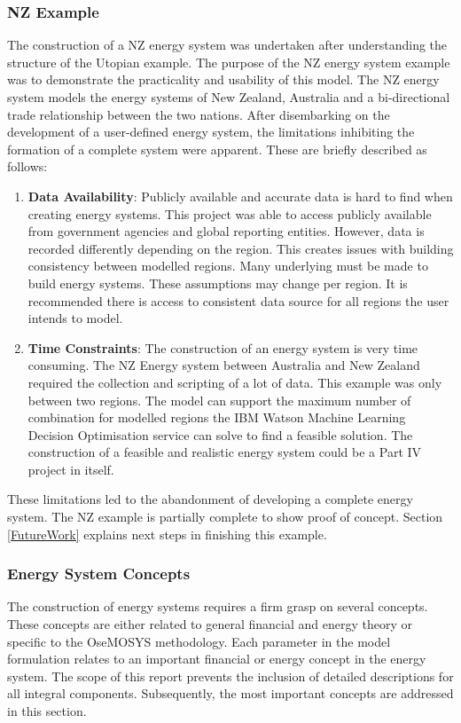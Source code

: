 \documentclass[12pt]{article}
\begin{document}
\subsubsection{NZ Example} \label{NZES}
The construction of a NZ energy system was undertaken after understanding the structure of the Utopian example.
The purpose of the NZ energy system example was to demonstrate the practicality and usability of this model.
The NZ energy system models the energy systems of New Zealand, Australia and a bi-directional trade relationship between the two nations.
After disembarking on the development of a user-defined energy system, the limitations inhibiting the formation of a complete system were apparent.
These are briefly described as follows:
\begin{enumerate}
	\item \textbf{Data Availability}: Publicly available and accurate data is hard to find when creating energy systems.
	This project was able to access publicly available from government agencies and global reporting entities.
	However, data is recorded differently depending on the region.
	This creates issues with building consistency between modelled regions.
	Many underlying must be made to build energy systems.
	These assumptions may change per region.
	It is recommended there is access to consistent data source for all regions the user intends to model.

	\item \textbf{Time Constraints}: The construction of an energy system is very time consuming.
	The NZ Energy system between Australia and New Zealand required the collection and scripting of a lot of data.
	This example was only between two regions.
	The model can support the maximum number of combination for modelled regions the IBM Watson Machine Learning Decision Optimisation service can solve to find a feasible solution.
	The construction of a feasible and realistic energy system could be a Part IV project in itself.
\end{enumerate}
These limitations led to the abandonment of developing a complete energy system.
The NZ example is partially complete to show proof of concept.
Section \ref{FutureWork} explains next steps in finishing this example.

\subsubsection{Energy System Concepts}
The construction of energy systems requires a firm grasp on several concepts. 
These concepts are either related to general financial and energy theory or specific to the OseMOSYS methodology.
Each parameter in the model formulation relates to an important financial or energy concept in the energy system.
The scope of this report prevents the inclusion of detailed descriptions for all integral components.
Subsequently, the most important concepts are addressed in this section. 
\end{document}
